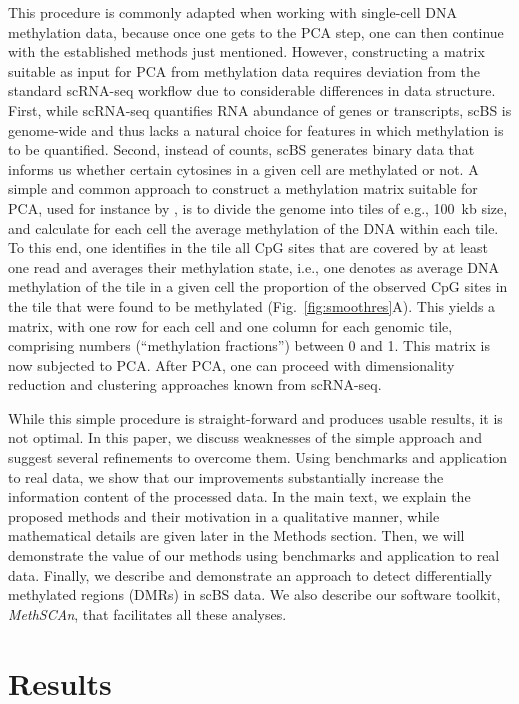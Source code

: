 \documentclass[10pt]{article}
\begin{document}
This procedure is commonly adapted when working with single-cell DNA methylation data, because once one gets to the PCA step, one can then continue with the established methods just mentioned.
However, constructing a matrix suitable as input for PCA from methylation data requires deviation from the standard scRNA-seq workflow due to considerable differences in data structure.
First, while scRNA-seq quantifies RNA abundance of genes or transcripts, scBS is genome-wide and thus lacks a natural choice for features in which methylation is to be quantified.
Second, instead of counts, scBS generates binary data that informs us whether certain cytosines in a given cell are methylated or not.
A simple and common approach to construct a methylation matrix suitable for PCA, used for instance by \citet{luo2017single}, is to divide the genome into tiles of e.g., 100~kb size, and calculate for each cell the average methylation of the DNA within each tile.
To this end, one identifies in the tile all CpG sites that are covered by at least one read and averages their methylation state, i.e., one denotes as average DNA methylation of the tile in a given cell the proportion of the observed CpG sites in the tile that were found to be methylated (Fig.~\ref{fig:smoothres}A).
This yields a matrix, with one row for each cell and one column for each genomic tile, comprising numbers (``methylation fractions'') between 0 and 1.
This matrix is now subjected to PCA.
After PCA, one can proceed with dimensionality reduction and clustering approaches known from scRNA-seq.

While this simple procedure is straight-forward and produces usable results, it is not optimal.
In this paper, we discuss weaknesses of the simple approach and suggest several refinements to overcome them.
Using benchmarks and application to real data, we show that our improvements substantially increase the information content of the processed data.
In the main text, we explain the proposed methods and their motivation in a qualitative manner, while mathematical details are given later in the Methods section.
Then, we will demonstrate the value of our methods using benchmarks and application to real data.
Finally, we describe and demonstrate an approach to detect differentially methylated regions (DMRs) in scBS data.
We also describe our software toolkit, \textit{MethSCAn}, that facilitates all these analyses.

\section*{Results}
\end{document}
